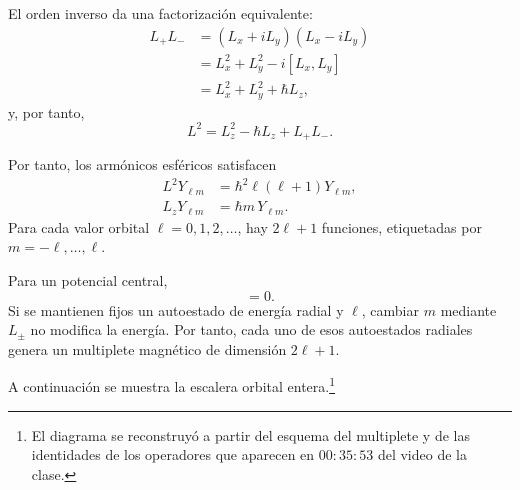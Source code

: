 El orden inverso da una factorización equivalente:
\begin{align}
L_+L_-
&=(L_x+iL_y)(L_x-iL_y) \\
&=L_x^2+L_y^2-i[L_x,L_y] \\
&=L_x^2+L_y^2+\hbar L_z,
\end{align}
y, por tanto,
\begin{equation}
L^2=L_z^2-\hbar L_z+L_+L_-.
\end{equation}

\begin{classroomqa}
\end{classroomqa}

Por tanto, los armónicos esféricos satisfacen
\begin{align}
L^2Y_{\ell m}
&=\hbar^2\ell(\ell+1)Y_{\ell m}, \\
L_zY_{\ell m}
&=\hbar m\,Y_{\ell m}.
\end{align}
Para cada valor orbital \(\ell=0,1,2,\ldots\), hay \(2\ell+1\) funciones, etiquetadas por \(m=-\ell,\ldots,\ell\).

Para un potencial central,
\begin{equation}
[H,L_i]=0.
\end{equation}
Si se mantienen fijos un autoestado de energía radial y \(\ell\), cambiar \(m\) mediante \(L_\pm\) no modifica la energía. Por tanto, cada uno de esos autoestados radiales genera un multiplete magnético de dimensión \(2\ell+1\).

A continuación se muestra la escalera orbital entera.\footnote{El diagrama se reconstruyó a partir del esquema del multiplete y de las identidades de los operadores que aparecen en \(00{:}35{:}53\) del video de la clase.}

